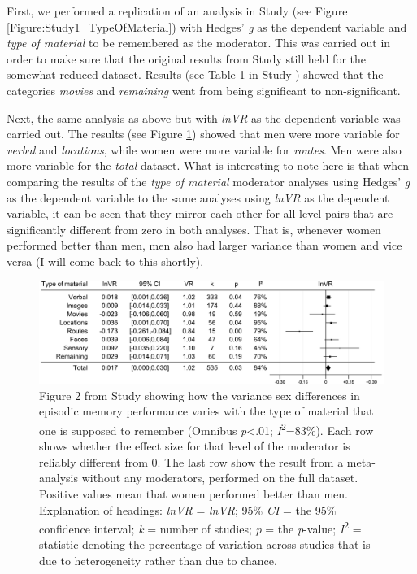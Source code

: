 First, we performed a replication of an analysis in Study  (see Figure \ref{Figure:Study1_TypeOfMaterial}) with Hedges' \emph{g} as the dependent variable and \emph{type of material} to be remembered as the moderator. This was carried out in order to make sure that the original results from Study  still held for the somewhat reduced dataset. Results (see Table 1 in Study ) showed that the categories \emph{movies} and \emph{remaining} went from being significant to non-significant.

Next, the same analysis as above but with \emph{lnVR} as the dependent variable was carried out. The results (see Figure \ref{Figure:Study2_Type_of_material}) showed that men were more variable for \emph{verbal} and \emph{locations}, while women were more variable for \emph{routes}. Men were also more variable for the \emph{total} dataset. What is interesting to note here is that when comparing the results of the \emph{type of material} moderator analyses using Hedges' \emph{g} as the dependent variable to the same analyses using \emph{lnVR} as the dependent variable, it can be seen that they mirror each other for all level pairs that are significantly different from zero in both analyses. That is, whenever women performed better than men, men also had larger variance than women and vice versa (I will come back to this shortly).

\begin{figure} \centering \includegraphics[width=120mm]{./Figures/Study2_Type_of_material.pdf} \caption{Figure 2 from Study  showing how the variance sex differences in episodic memory performance varies with the type of material that one is supposed to remember (Omnibus \emph{p}<.01;  \emph{I}\textsuperscript{2}=83\%). Each row shows whether the effect size for that level of the moderator is reliably different from 0. The last row show the result from a meta-analysis without any moderators, performed on the full dataset. Positive values mean that women performed better than men. Explanation of headings: \emph{lnVR} = \emph{lnVR}; 95\% \emph{CI} = the 95\% confidence interval; \emph{k} = number of studies; \emph{p} = the \emph{p}-value; \emph{I}\textsuperscript{2} = statistic denoting the percentage of variation across studies that is due to heterogeneity rather than due to chance.} \label{Figure:Study2_Type_of_material} \end{figure}


